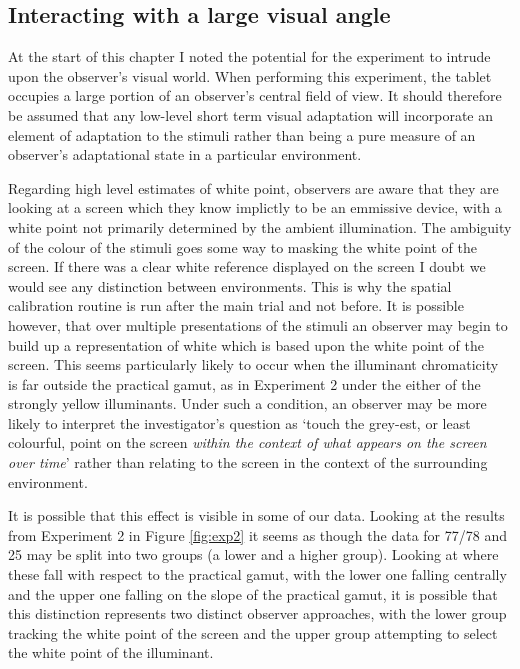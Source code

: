 \subsection{Interacting with a large visual angle}

At the start of this chapter I noted the potential for the experiment to intrude upon the observer's visual world. When performing this experiment, the tablet occupies a large portion of an observer's central field of view. It should therefore be assumed that any low-level short term visual adaptation will incorporate an element of adaptation to the stimuli rather than being a pure measure of an observer's adaptational state in a particular environment. 

Regarding high level estimates of white point, observers are aware that they are looking at a screen which they know implictly to be an emmissive device, with a white point not primarily determined by the ambient illumination. The ambiguity of the colour of the stimuli goes some way to masking the white point of the screen. If there was a clear white reference displayed on the screen I doubt we would see any distinction between environments. This is why the spatial calibration routine is run after the main trial and not before. It is possible however, that over multiple presentations of the stimuli an observer may begin to build up a representation of white which is based upon the white point of the screen. This seems particularly likely to occur when the illuminant chromaticity is far outside the practical gamut, as in Experiment 2 under the either of the strongly yellow illuminants. Under such a condition, an observer may be more likely to interpret the investigator's question as `touch the grey-est, or least colourful, point on the screen \emph{within the context of what appears on the screen over time}' rather than relating to the screen in the context of the surrounding environment.

It is possible that this effect is visible in some of our data. Looking at the results from Experiment 2 in Figure \ref{fig:exp2} it seems as though the data for 77/78 and 25 may be split into two groups (a lower and a higher group). Looking at where these fall with respect to the practical gamut, with the lower one falling centrally and the upper one falling on the slope of the practical gamut, it is possible that this distinction represents two distinct observer approaches, with the lower group tracking the white point of the screen and the upper group attempting to select the white point of the illuminant.


